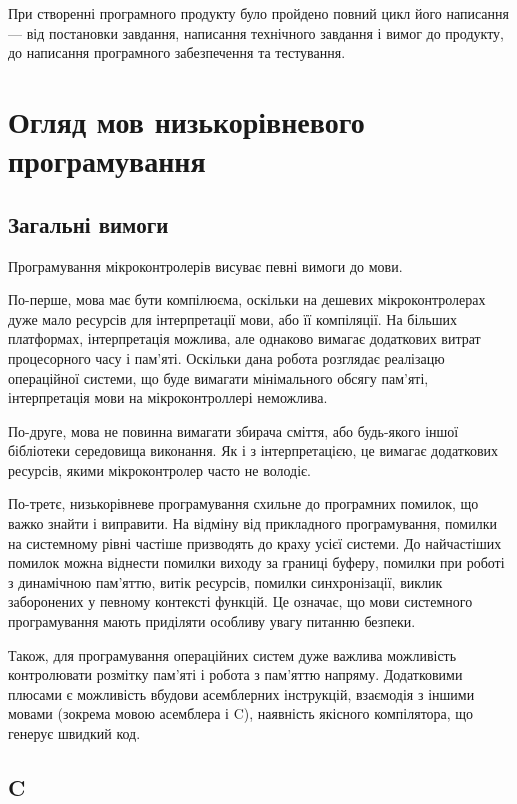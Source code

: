 \documentclass[main.tex]{subfiles}
\begin{document}
При створенні програмного продукту було пройдено повний цикл його написання --- від постановки завдання, написання технічного завдання і вимог до продукту, до написання програмного забезпечення та тестування.

\chapter{Огляд мов низькорівневого програмування}

\newcommand\LangC{C}

\section{Загальні вимоги}

Програмування мікроконтролерів висуває певні вимоги до мови.

По-перше, мова має бути компілюєма, оскільки на дешевих мікроконтролерах дуже мало ресурсів для інтерпретації мови, або її компіляції. На більших платформах, інтерпретація можлива, але однаково вимагає додаткових витрат процесорного часу і пам'яті. Оскільки дана робота розглядає реалізацю операційної системи, що буде вимагати мінімального обсягу пам'яті, інтерпретація мови на мікроконтроллері неможлива.

По-друге, мова не повинна вимагати збирача сміття, або будь-якого іншої бібліотеки середовища виконання. Як і з інтерпретацією, це вимагає додаткових ресурсів, якими мікроконтролер часто не володіє.

По-третє, низькорівневе програмування схильне до програмних помилок, що важко знайти і виправити. На відміну від прикладного програмування, помилки на системному рівні частіше призводять до краху усієї системи. До найчастіших помилок можна віднести помилки виходу за границі буферу, помилки при роботі з динамічною пам'яттю, витік ресурсів, помилки синхронізації, виклик заборонених у певному контексті функцій. Це означає, що мови системного програмування мають приділяти особливу увагу питанню безпеки.

Також, для програмування операційних систем дуже важлива можливість контролювати розмітку пам'яті і робота з пам'яттю напряму. Додатковими плюсами є можливість вбудови асемблерних інструкцій, взаємодія з іншими мовами (зокрема мовою асемблера і \LangC{}), наявність якісного компілятора, що генерує швидкий код.

\section{C}
\end{document}
